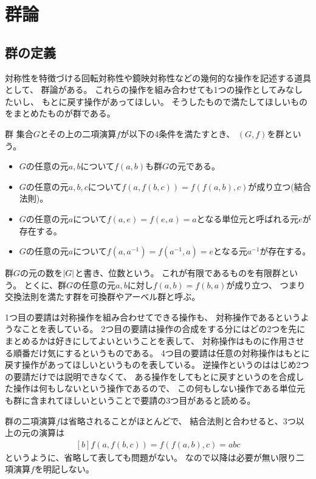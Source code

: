 \documentclass[../master.tex]{subfiles}
\begin{document}
\chapter{群論}
\section{群の定義}
対称性を特徴づける回転対称性や鏡映対称性などの幾何的な操作を記述する道具として、
群論がある。
これらの操作を組み合わせても1つの操作としてみなしたいし、
もとに戻す操作があってほしい。
そうしたもので満たしてほしいものをまとめたものが群である。
\begin{defbox}{群}{}
    集合\(G\)とその上の二項演算\(f\)が以下の4条件を満たすとき、
    \((G,f)\)を群という。
    \begin{itemize}
        \item \(G\)の任意の元\(a,b\)について\(f(a,b)\)も群\(G\)の元である。
        \item \(G\)の任意の元\(a,b,c\)について\(f(a,f(b,c))=f(f(a,b),c)\)が成り立つ(結合法則)。
        \item \(G\)の任意の元\(a\)について\(f(a,e)=f(e,a)=a\)となる単位元と呼ばれる元\(e\)が存在する。
        \item \(G\)の任意の元\(a\)について\(f(a,a^{-1})=f(a^{-1},a)=e\)となる元\(a^{-1}\)が存在する。
    \end{itemize}
    群\(G\)の元の数を\(\abs{G}\)と書き、位数という。
    これが有限であるものを有限群という。
    とくに、群\(G\)の任意の元\(a,b\)に対し\(f(a,b)=f(b,a)\)が成り立つ、
    つまり交換法則を満たす群を可換群やアーベル群と呼ぶ。
\end{defbox}

1つ目の要請は対称操作を組み合わせてできる操作も、
対称操作であるというようなことを表している。
2つ目の要請は操作の合成をする分にはどの2つを先にまとめるかは好きにしてよいということを表して、
対称操作はものに作用させる順番だけ気にするというものである。
4つ目の要請は任意の対称操作はもとに戻す操作があってほしいというものを表している。
逆操作というのははじめ2つの要請だけでは説明できなくて、
ある操作をしてもとに戻すというのを合成した操作は何もしないという操作であるので、
この何もしない操作である単位元も群に含まれてほしいということで要請の3つ目があると読める。

群の二項演算\(f\)は省略されることがほとんどで、
結合法則と合わせると、3つ以上の元の演算は
\begin{equation}\begin{aligned}[b]
    f(a,f(b,c))=f(f(a,b),c) = abc
\end{aligned}\end{equation}
というように、省略して表しても問題がない。
なので以降は必要が無い限り二項演算\(f\)を明記しない。
\end{document}
